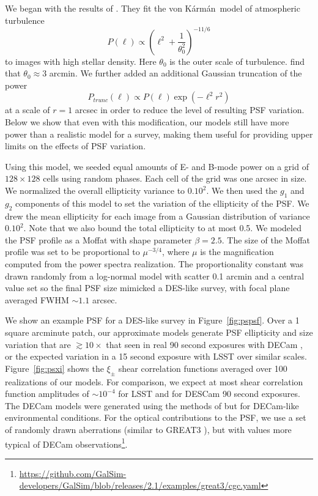 \documentclass[draft, iop, twocolappendix, appendixfloats, numberedappendix, apj]{hackemulateapj}
\newcommand{\vonkarman}{{von K\'arm\'an}~}
\begin{document}
We began with the results of \citet{heymans2012}. They fit the \vonkarman model
of atmospheric turbulence
\begin{displaymath}
  P(\ell) \propto \left(\ell^{2} + \frac{1}{\theta_{0}^2}\right)^{-11/6}
\end{displaymath}
to images with high stellar density. Here $\theta_{0}$ is the outer scale of
turbulence. \citep{heymans2012} find that $\theta_{0}\approx3$ arcmin.
We further added an additional Gaussian truncation of the power
\begin{displaymath}
  P_{trunc}(\ell) \propto P(\ell)\exp\left(-\ell^2r^{2}\right)
\end{displaymath}
at a scale of $r=1$ arcsec in order to reduce the level of resulting
PSF variation. Below we show that even with this modification, our models
still have more power than a realistic model for a survey, making them useful
for providing upper limits on the effects of PSF variation.

Using this model, we seeded equal amounts of E- and B-mode power on a grid of
$128\times128$ cells using random phases. Each cell of the grid was one
arcsec in size. We normalized the overall ellipticity variance to $0.10^2$. We then used
the $g_1$ and $g_2$ components of this model to set the variation of the ellipticity of
the PSF. We drew the mean ellipticity for each image from a Gaussian distribution of
variance $0.10^2$. Note that we also bound the total ellipticity to at most 0.5.
We modeled the PSF profile as a Moffat with shape parameter $\beta=2.5$.
The size of the Moffat profile was set to be proportional to $\mu^{-3/4}$,
where $\mu$ is the magnification computed from the power spectra realization. The
proportionality constant was drawn randomly from a log-normal model with
scatter 0.1 arcmin and a central value set so the final PSF size mimicked a DES-like
survey, with focal plane averaged FWHM $\sim1.1$ arcsec.

We show an example PSF for a DES-like survey in Figure~\ref{fig:pspsf}.  Over a
1 square arcminute patch, our approximate models generate PSF ellipticity and size
variation that are $\gtrsim10\times$ that seen in real 90 second exposures
with DECam \citep{DESY1shear}, or the expected variation in a 15 second exposure with
LSST \citep{jee2011} over similar scales. Figure~\ref{fig:psxi} shows the $\xi_{\pm}$ shear correlation
functions averaged over 100 realizations of our models. For comparison, we
expect at most shear correlation function amplitudes of $\sim10^{-4}$ for LSST
\citep{jee2011} and for DESCam 90 second exposures. The DECam models were generated
using the methods of \citet{jee2011} but for DECam-like environmental conditions. For
the optical contributions to the PSF, we use a set of randomly drawn
aberrations (similar to GREAT3 \citep{great3}), but with values more typical of
DECam observations\footnote{\url{https://github.com/GalSim-developers/GalSim/blob/releases/2.1/examples/great3/cgc.yaml}}.
\end{document}
